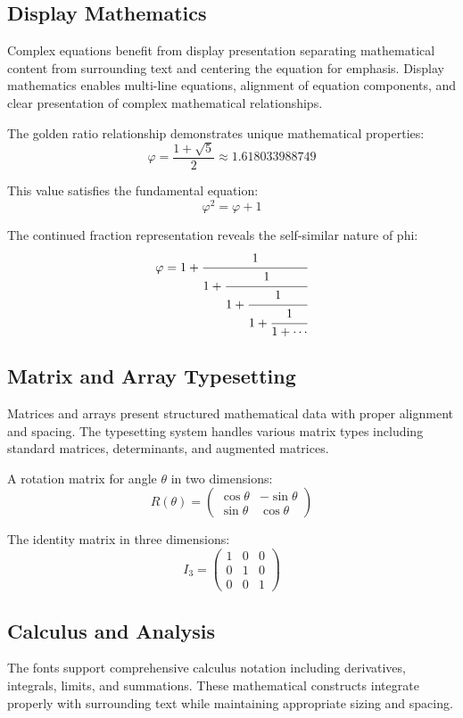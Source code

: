 \documentclass[11pt,letterpaper]{article}
\begin{document}
\subsection{Display Mathematics}

Complex equations benefit from display presentation separating mathematical content from surrounding text and centering the equation for emphasis. Display mathematics enables multi-line equations, alignment of equation components, and clear presentation of complex mathematical relationships.

The golden ratio relationship demonstrates unique mathematical properties:
\[
\varphi = \frac{1 + \sqrt{5}}{2} \approx 1.618033988749
\]

This value satisfies the fundamental equation:
\[
\varphi^2 = \varphi + 1
\]

The continued fraction representation reveals the self-similar nature of phi:
\[
\varphi = 1 + \cfrac{1}{1 + \cfrac{1}{1 + \cfrac{1}{1 + \cfrac{1}{1 + \cdots}}}}
\]

\subsection{Matrix and Array Typesetting}

Matrices and arrays present structured mathematical data with proper alignment and spacing. The typesetting system handles various matrix types including standard matrices, determinants, and augmented matrices.

A rotation matrix for angle $\theta$ in two dimensions:
\[
R(\theta) = \begin{pmatrix}
\cos\theta & -\sin\theta \\
\sin\theta & \cos\theta
\end{pmatrix}
\]

The identity matrix in three dimensions:
\[
I_3 = \begin{pmatrix}
1 & 0 & 0 \\
0 & 1 & 0 \\
0 & 0 & 1
\end{pmatrix}
\]

\subsection{Calculus and Analysis}

The fonts support comprehensive calculus notation including derivatives, integrals, limits, and summations. These mathematical constructs integrate properly with surrounding text while maintaining appropriate sizing and spacing.
\end{document}
